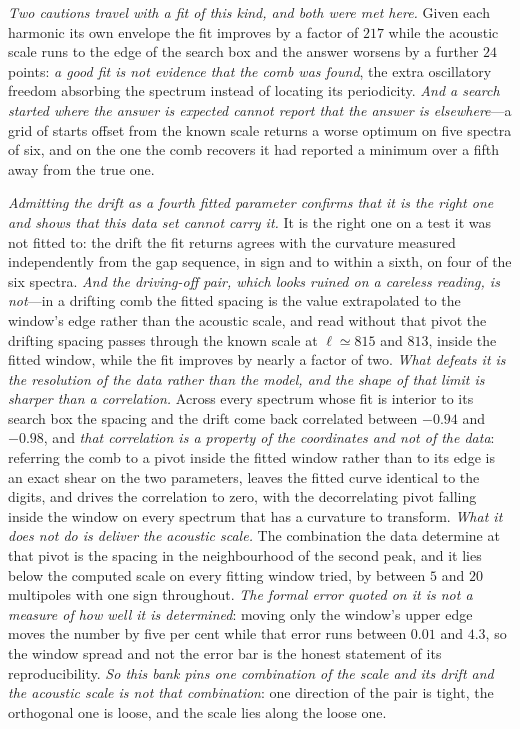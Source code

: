 \documentclass[11pt,a4paper]{article}
\theoremstyle{plain}
\theoremstyle{definition}
\theoremstyle{remark}
\begin{document}
\emph{Two cautions travel with a fit of this kind, and both were met here.} Given each harmonic its
own envelope the fit improves by a factor of $217$ while the acoustic scale runs to the edge of the
search box and the answer worsens by a further $24$ points: \emph{a good fit is not evidence that the
comb was found}, the extra oscillatory freedom absorbing the spectrum instead of locating its
periodicity. \emph{And a search started where the answer is expected cannot report that the answer is
elsewhere}---a grid of starts offset from the known scale returns a worse optimum on five spectra of
six, and on the one the comb recovers it had reported a minimum over a fifth away from the true
one.

\emph{Admitting the drift as a fourth fitted parameter confirms that it is the right one and shows
that this data set cannot carry it.} It is the right one on a test it was not fitted to: the drift
the fit returns agrees with the curvature measured independently from the gap sequence, in sign and
to within a sixth, on four of the six spectra. \emph{And the driving-off pair, which looks ruined on
a careless reading, is not}---in a drifting comb the fitted spacing is the value extrapolated to the
window's edge rather than the acoustic scale, and read without that pivot the drifting spacing passes
through the known scale at $\ell\simeq815$ and $813$, inside the fitted window, while the fit
improves by nearly a factor of two. \emph{What defeats it is the resolution of the data rather than
the model, and the shape of that limit is sharper than a correlation.} Across every spectrum whose fit
is interior to its search box the spacing and the drift come back correlated between $-0.94$ and
$-0.98$, and \emph{that correlation is a property of the coordinates and not of the data}: referring
the comb to a pivot inside the fitted window rather than to its edge is an exact shear on the two
parameters, leaves the fitted curve identical to the digits, and drives the correlation to zero, with
the decorrelating pivot falling inside the window on every spectrum that has a curvature to transform.
\emph{What it does not do is deliver the acoustic scale.} The combination the data determine at that
pivot is the spacing in the neighbourhood of the second peak, and it lies below the computed scale on
every fitting window tried, by between $5$ and $20$ multipoles with one sign throughout. \emph{The
formal error quoted on it is not a measure of how well it is determined}: moving only the window's
upper edge moves the number by five per cent while that error runs between $0.01$ and $4.3$, so the
window spread and not the error bar is the honest statement of its reproducibility. \emph{So this bank
pins one combination of the scale and its drift and the acoustic scale is not that combination}: one
direction of the pair is tight, the orthogonal one is loose, and the scale lies along the loose one.
\end{document}
